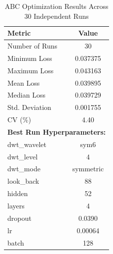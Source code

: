\begin{table}[htbp]
\centering
\caption{ABC Optimization Results Across 30 Independent Runs}
\label{tab:abc_results}
\begin{tabular}{lc}
\hline
\textbf{Metric} & \textbf{Value} \\
\hline
Number of Runs & 30 \\
Minimum Loss   & 0.037375 \\
Maximum Loss   & 0.043163 \\
Mean Loss      & 0.039895 \\
Median Loss    & 0.039729 \\
Std. Deviation & 0.001755 \\
CV (\%)       & 4.40 \\
\hline
\multicolumn{2}{l}{\textbf{Best Run Hyperparameters:}} \\
dwt\_wavelet   & sym6 \\
dwt\_level     & 4 \\
dwt\_mode      & symmetric \\
look\_back     & 88 \\
hidden         & 52 \\
layers         & 4 \\
dropout        & 0.0390 \\
lr             & 0.00064 \\
batch          & 128 \\
\hline
\end{tabular}
\end{table}
